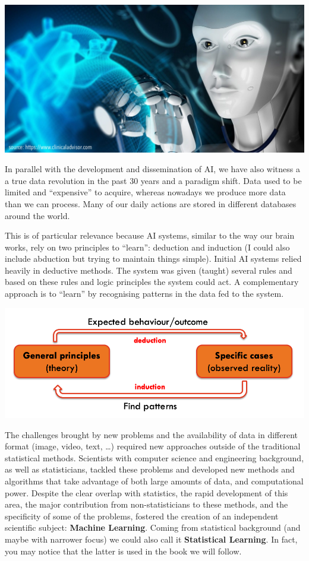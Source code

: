 \documentclass[
]{book}
\begin{document}
\begin{center}\includegraphics[width=1\linewidth]{robot} \end{center}

In parallel with the development and dissemination of AI, we have also witness a
a true data revolution in the past 30 years and a paradigm shift. Data used to
be limited and ``expensive'' to acquire, whereas nowadays we produce more data than
we can process. Many of our daily actions are stored in different databases
around the world.

This is of particular relevance because AI systems, similar to the way our
brain works, rely on two principles to ``learn'': deduction and induction (I
could also include abduction but trying to maintain things simple). Initial
AI systems relied heavily in deductive methods. The system was given (taught)
several rules and based on these rules and logic principles the
system could act. A complementary approach is to ``learn''
by recognising patterns in the data fed to the system.

\begin{center}\includegraphics[width=1\linewidth]{induction} \end{center}

The challenges brought by new problems and the availability of data in
different format (image, video, text, \ldots) required new approaches outside of
the traditional statistical methods. Scientists with computer science and
engineering background, as well as statisticians, tackled these problems and
developed new methods and algorithms that take advantage of both large amounts
of data, and computational power. Despite the clear overlap with statistics,
the rapid development of this area, the major contribution from
non-statisticians to these methods, and the specificity of some of the problems,
fostered the creation of an independent scientific subject: \textbf{Machine Learning}.
Coming from statistical background (and
maybe with narrower focus) we could also call it \textbf{Statistical Learning}. In
fact, you may notice that the latter is used in the book we will follow.
\end{document}
